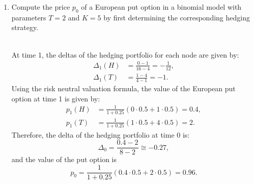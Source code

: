 \documentclass[11pt,a4,table]{article}
\begin{document}
\begin{enumerate}
\begin{enumerate}
        
        \item Compute the price $p_0$ of a European put option in a binomial model with parameters $T=2$ and $K=5$ by first determining the corresponding hedging strategy.
        \begin{figure}[hp]
        \end{figure}
        \\
        At time 1, the deltas of the hedging portfolio for each node are given by:
        \begin{align*}
            \Delta_1(H) &= \frac{0-1}{16-4} = - \frac{1}{12},\\
            \Delta_1(T) &= \frac{1-4}{4-1} = -1.
        \end{align*}
        Using the risk neutral valuation formula, the value of the European put option at time 1 is given by:
        \begin{align*}
            p_1(H) &= \frac{1}{1+0.25}(0\cdot 0.5 + 1\cdot 0.5) = 0.4,\\
            p_1(T) &= \frac{1}{1+0.25}(1\cdot 0.5 + 4\cdot 0.5) = 2.
        \end{align*}
        Therefore, the delta of the hedging portfolio at time 0 is:
        \begin{equation*}
            \Delta_0 = \frac{0.4-2}{8-2}\cong -0.27,
        \end{equation*}
        and the value of the put option is
        \begin{equation*}
            p_0 = \frac{1}{1+0.25}(0.4\cdot 0.5 + 2\cdot 0.5) = 0.96.
        \end{equation*}
        

\end{enumerate}
\end{enumerate}
\end{document}
